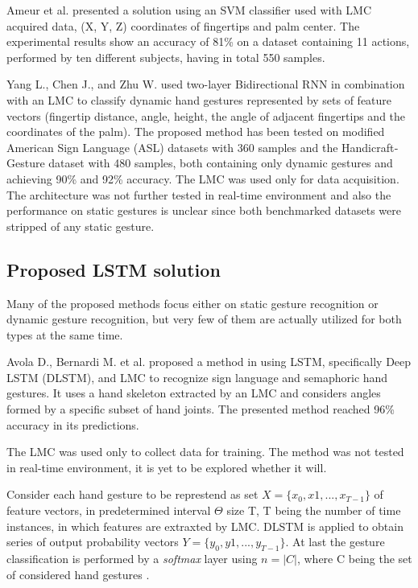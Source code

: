 Ameur et al. \cite{ameur} presented a solution using an SVM classifier used with LMC acquired data, (X, Y, Z) coordinates of fingertips and palm center. The experimental results show an accuracy of 81\% on a dataset containing 11 actions, performed by ten different subjects, having in total 550 samples.

Yang L., Chen J., and Zhu W. \cite{bidirect_dynam} used two-layer Bidirectional RNN in combination with an LMC to classify dynamic hand gestures represented by sets of feature vectors (fingertip distance, angle, height, the angle of adjacent fingertips and the coordinates of the palm). The proposed method has been tested on modified American Sign Language (ASL) datasets with 360 samples and the Handicraft‐Gesture dataset with 480 samples, both containing only dynamic gestures and achieving 90\% and 92\% accuracy. The LMC was used only for data acquisition. The architecture was not further tested in real-time environment and also the performance on static gestures is unclear since both benchmarked datasets were stripped of any static gesture. \cite{bidirect_dynam}

\subsection{Proposed LSTM solution}

Many of the proposed methods focus either on static gesture recognition or dynamic gesture recognition, but very few of them are actually utilized for both types at the same time. 

Avola D., Bernardi M. et al. proposed a method in \cite{avola} using LSTM, specifically Deep LSTM (DLSTM), and LMC to recognize sign language and semaphoric hand gestures. It uses a hand skeleton extracted by an LMC and considers angles formed by a specific subset of hand joints. The presented method reached 96\% accuracy in its predictions.

The LMC was used only to collect data for training. The method was not tested in real-time environment, it is yet to be explored whether it will.

Consider each hand gesture to be represtend as set $X = \{x_0, x1, ..., x_{T-1}\}$ of feature vectors, in predetermined interval $\Theta$ size T, T being the number of time instances, in which features are extraxted by LMC. DLSTM is applied to obtain series of output probability vectors $Y = \{y_0, y1, ..., y_{T-1}\}$. At last the gesture classification is performed by a \textit{softmax} layer using $n = |C|$, where C being the set of considered hand gestures \cite{avola}.

